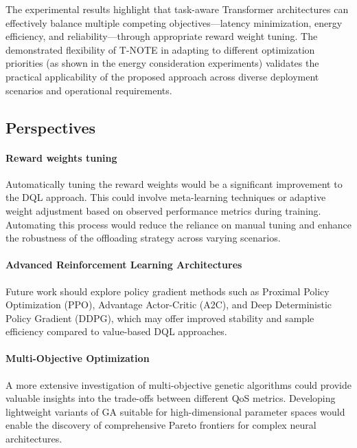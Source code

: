 \documentclass{svproc}
\begin{document}
The experimental results highlight that task-aware Transformer architectures can effectively balance multiple competing objectives—latency minimization, energy efficiency, and reliability—through appropriate reward weight tuning. The demonstrated flexibility of T-NOTE in adapting to different optimization priorities (as shown in the energy consideration experiments) validates the practical applicability of the proposed approach across diverse deployment scenarios and operational requirements.

\subsection{Perspectives}


\paragraph{Reward weights tuning}

Automatically tuning the reward weights would be a significant improvement to the DQL approach. This could involve meta-learning techniques or adaptive weight adjustment based on observed performance metrics during training. Automating this process would reduce the reliance on manual tuning and enhance the robustness of the offloading strategy across varying scenarios.


\paragraph{Advanced Reinforcement Learning Architectures}
Future work should explore policy gradient methods such as Proximal Policy Optimization (PPO), Advantage Actor-Critic (A2C), and Deep Deterministic Policy Gradient (DDPG), which may offer improved stability and sample efficiency compared to value-based DQL approaches.


\paragraph{Multi-Objective Optimization}
A more extensive investigation of multi-objective genetic algorithms could provide valuable insights into the trade-offs between different QoS metrics. Developing lightweight variants of GA suitable for high-dimensional parameter spaces would enable the discovery of comprehensive Pareto frontiers for complex neural architectures.

%
%
\end{document}
